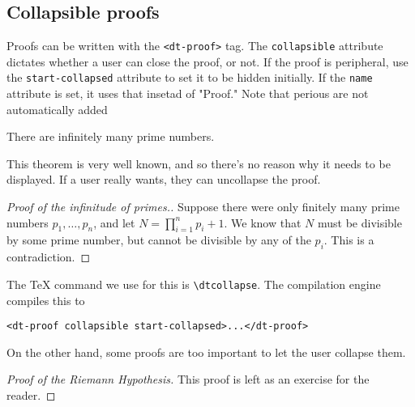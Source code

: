\documentclass[11pt]{article}
\begin{document}
\subsection{Collapsible proofs}
Proofs can be written with the \verb|<dt-proof>| tag.
The \verb|collapsible| attribute dictates whether a user can close the proof, or not.
If the proof is peripheral, use the \verb|start-collapsed| attribute to set it to be hidden initially. If the \verb|name| attribute is set, it uses that insetad of "Proof."
Note that perious are not automatically added

\begin{theorem}[Euclid]
    There are infinitely many prime numbers.
\end{theorem}

This theorem is very well known, and so there's no reason why it needs to be displayed.
If a user really wants, they can uncollapse the proof.

\begin{proof}[Proof of the infinitude of primes.]\dtcollapse\dtstartcollapsed
    Suppose there were only finitely many prime numbers $p_1,\dots,p_n$, and let $N=\prod_{i=1}^n p_i+1$.
    We know that $N$ must be divisible by some prime number, but cannot be divisible by any of the $p_i$.
    This is a contradiction.
\end{proof}

The \TeX{} command we use for this is \verb|\dtcollapse|.
The compilation engine compiles this to
\begin{verbatim}
<dt-proof collapsible start-collapsed>...</dt-proof>
\end{verbatim}

On the other hand, some proofs are too important to let the user collapse them.
\begin{proof}[Proof of the Riemann Hypothesis]\dtnocollapse
    This proof is left as an exercise for the reader.
\end{proof}
\end{document}
